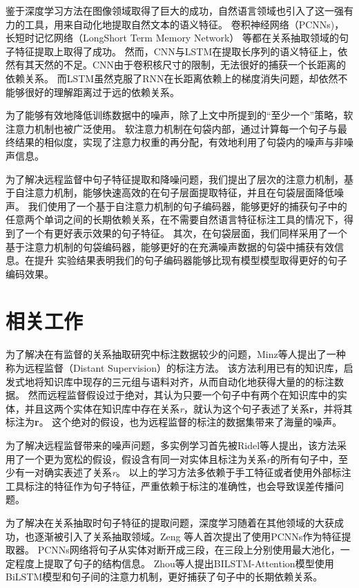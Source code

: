 \documentclass[UTF8]{csoarticle}
\begin{document}
鉴于深度学习方法在图像领域取得了巨大的成功，自然语言领域也引入了这一强有力的工具，用来自动化地提取自然文本的语义特征。
卷积神经网络（PCNNs)\cite{bib3}，长短时记忆网络（LongShort Term Memory Network）\cite{bib4} 等都在关系抽取领域的句子特征提取上取得了成功。
然而，CNN与LSTM在提取长序列的语义特征上，依然有其天然的不足。CNN由于卷积核尺寸的限制，无法很好的捕获一个长距离的依赖关系。
而LSTM虽然克服了RNN在长距离依赖上的梯度消失问题，却依然不能够很好的理解距离过于远的依赖关系。

为了能够有效地降低训练数据中的噪声，除了上文中所提到的“至少一个”策略，软注意力机制也被广泛使用。
软注意力机制在句袋内部，通过计算每一个句子与最终结果的相似度，实现了注意力权重的再分配，有效地利用了句袋内的噪声与非噪声信息。

为了解决远程监督中句子特征提取和降噪问题，我们提出了层次的注意力机制，基于自注意力机制，能够快速高效的在句子层面提取特征，并且在句袋层面降低噪声。
我们使用了一个基于自注意力机制的句子编码器，能够更好的捕获句子中的任意两个单词之间的长期依赖关系，在不需要自然语言特征标注工具的情况下，得到了一个有更好表示效果的句子特征。
其次，在句袋层面，我们同样采用了一个基于注意力机制的句袋编码器，能够更好的在充满噪声数据的句袋中捕获有效信息。在提升
实验结果表明我们的句子编码器能够比现有模型模型取得更好的句子编码效果。

\section{相关工作}
为了解决在有监督的关系抽取研究中标注数据较少的问题，Minz\cite{bib1}等人提出了一种称为远程监督（Distant Supervision）的标注方法。
该方法利用已有的知识库，启发式地将知识库中现存的三元组与语料对齐，从而自动化地获得大量的的标注数据。
然而远程监督假设过于绝对，其认为只要一个句子中有两个在知识库中的实体，并且这两个实体在知识库中存在关系\textit{r}，就认为这个句子表述了关系\textbf{r}，并将其标注为\textbf{r}。
这个绝对的假设，也为远程监督的标注的数据集带来了海量的噪声。

为了解决远程监督带来的噪声问题，多实例学习首先被Ridel\cite{bib2}等人提出，该方法采用了一个更为宽松的假设，假设含有同一对实体且标注为关系\textit{r}的所有句子中，至少有一对确实表述了关系\textit{r}。
以上的学习方法多依赖于手工特征或者使用外部标注工具标注的特征作为句子特征，严重依赖于标注的准确性，也会导致误差传播问题。

为了解决在关系抽取时句子特征的提取问题，深度学习随着在其他领域的大获成功，也逐渐被引入了关系抽取领域。Zeng\cite{bib3} 等人首次提出了使用PCNNs作为特征提取器。
PCNNs网络将句子从实体对断开成三段，在三段上分别使用最大池化，一定程度上提取了句子的结构信息。
Zhou\cite{bib4}等人提出BILSTM-Attention模型使用BiLSTM模型和句子间的注意力机制，更好捕获了句子中的长期依赖关系。
\end{document}
